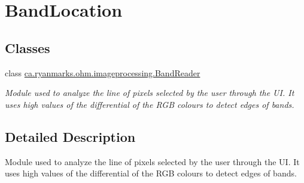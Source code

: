 \hypertarget{group___band_location}{}\section{Band\+Location}
\label{group___band_location}
\subsection*{Classes}
\begin{DoxyCompactItemize}
\item 
class \hyperlink{classca_1_1ryanmarks_1_1ohm_1_1imageprocessing_1_1_band_reader}{ca.\+ryanmarks.\+ohm.\+imageprocessing.\+Band\+Reader}
\begin{DoxyCompactList}\small\item\em Module used to analyze the line of pixels selected by the user through the UI. It uses high values of the differential of the R\+GB colours to detect edges of bands. \end{DoxyCompactList}\end{DoxyCompactItemize}


\subsection{Detailed Description}
Module used to analyze the line of pixels selected by the user through the UI. It uses high values of the differential of the R\+GB colours to detect edges of bands. 